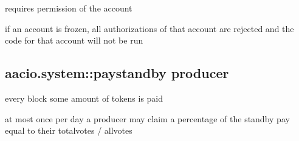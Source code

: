 \begin{DoxyItemize}
\item requires permission of the  account
\item if an account is frozen, all authorizations of that account are rejected and the code for that account will not be run
\end{DoxyItemize}

\subsection*{aacio.\+system\+::paystandby producer}


\begin{DoxyItemize}
\item every block some amount of tokens is paid
\item at most once per day a producer may claim a percentage of the standby pay equal to their totalvotes / allvotes 
\end{DoxyItemize}